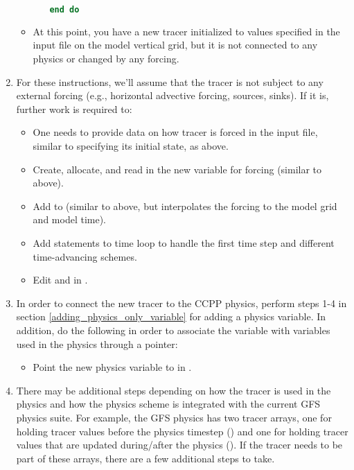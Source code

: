 \begin{enumerate}
\begin{itemize}
\begin{itemize}
\begin{lstlisting}[language = Fortran]
		end do
		\end{lstlisting}
		\end{itemize}
	\item At this point, you have a new tracer initialized to values specified in the input file on the model vertical grid, but it is not connected to any physics or changed by any forcing.
	\end{itemize}
\item For these instructions, we'll assume that the tracer is not subject to any external forcing (e.g., horizontal advective forcing, sources, sinks). If it is, further work is required to:
	\begin{itemize}
	\item One needs to provide data on how tracer is forced in the input file, similar to specifying its initial state, as above.
	\item Create, allocate, and read in the new variable for forcing (similar to above).
	\item Add to  (similar to above, but interpolates the forcing to the model grid and model time).
	\item Add statements to time loop to handle the first time step and different time-advancing schemes.
	\item Edit  and  in .
	\end{itemize}
\item In order to connect the new tracer to the CCPP physics, perform steps 1-4 in section \ref{adding_physics_only_variable} for adding a physics variable. In addition, do the following in order to associate the  variable with variables used in the physics through a pointer:
	\begin{itemize}
	\item Point the new physics variable to  in .
	\end{itemize}
\item There may be additional steps depending on how the tracer is used in the physics and how the physics scheme is integrated with the current GFS physics suite. For example, the GFS physics has two tracer arrays, one for holding tracer values before the physics timestep () and one for holding tracer values that are updated during/after the physics (). If the tracer needs to be part of these arrays, there are a few additional steps to take.
\end{enumerate}

